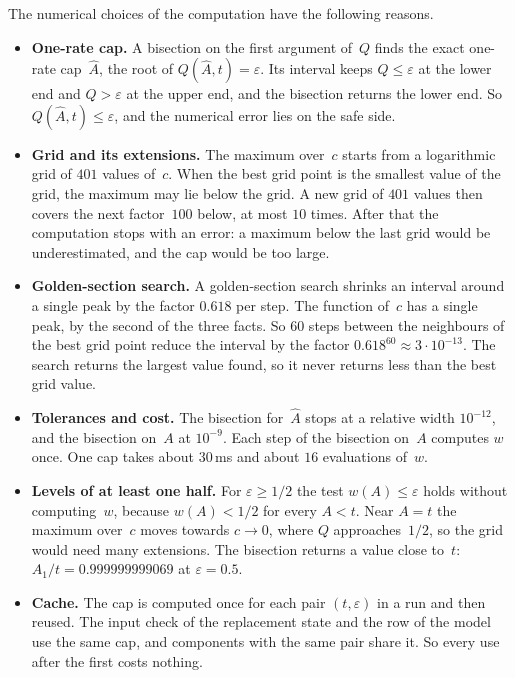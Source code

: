 \documentclass[11pt,a4paper]{article}
\theoremstyle{plain}
\theoremstyle{definition}
\theoremstyle{remark}
\begin{document}
The numerical choices of the computation have the following reasons.
\begin{itemize}
  \item \textbf{One-rate cap.} A bisection on the first argument of~$Q$ finds the exact one-rate cap~$\hat A$, the root of $Q(\hat A, t) = \varepsilon$.
    Its interval keeps $Q \le \varepsilon$ at the lower end and $Q > \varepsilon$ at the upper end, and the bisection returns the lower end.
    So $Q(\hat A, t) \le \varepsilon$, and the numerical error lies on the safe side.
  \item \textbf{Grid and its extensions.} The maximum over~$c$ starts from a logarithmic grid of $401$ values of~$c$.
    When the best grid point is the smallest value of the grid, the maximum may lie below the grid.
    A new grid of $401$ values then covers the next factor~$100$ below, at most $10$ times.
    After that the computation stops with an error: a maximum below the last grid would be underestimated, and the cap would be too large.
  \item \textbf{Golden-section search.} A golden-section search shrinks an interval around a single peak by the factor $0.618$ per step.
    The function of~$c$ has a single peak, by the second of the three facts.
    So $60$ steps between the neighbours of the best grid point reduce the interval by the factor $0.618^{60} \approx 3 \cdot 10^{-13}$.
    The search returns the largest value found, so it never returns less than the best grid value.
  \item \textbf{Tolerances and cost.} The bisection for~$\hat A$ stops at a relative width $10^{-12}$, and the bisection on~$A$ at $10^{-9}$.
    Each step of the bisection on~$A$ computes $w$ once.
    One cap takes about $30$\,ms and about $16$ evaluations of~$w$.
  \item \textbf{Levels of at least one half.} For $\varepsilon \ge 1/2$ the test $w(A) \le \varepsilon$ holds without computing~$w$, because $w(A) < 1/2$ for every $A < t$.
    Near $A = t$ the maximum over~$c$ moves towards $c \to 0$, where $Q$ approaches~$1/2$, so the grid would need many extensions.
    The bisection returns a value close to~$t$: $A_1/t = 0.999999999069$ at $\varepsilon = 0.5$.
  \item \textbf{Cache.} The cap is computed once for each pair $(t, \varepsilon)$ in a run and then reused.
    The input check of the replacement state and the row of the model use the same cap, and components with the same pair share it.
    So every use after the first costs nothing.

\end{itemize}
\end{document}
